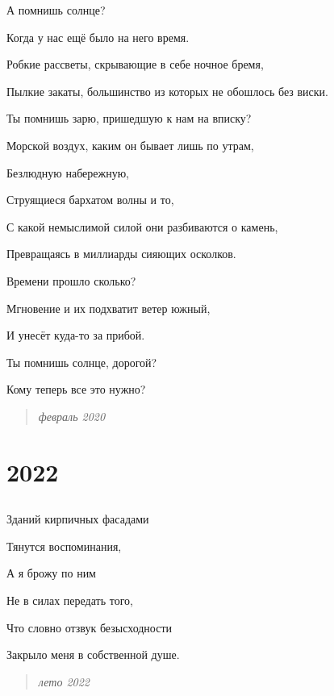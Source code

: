 \documentclass[
  a5paperpaper,
  DIV=11,
  numbers=noendperiod]{scrreprt}
\begin{document}
А помнишь солнце?

Когда у нас ещё было на него время.

Робкие рассветы, скрывающие в себе ночное бремя,

Пылкие закаты, большинство из которых не обошлось без виски.

Ты помнишь зарю, пришедшую к нам на вписку?

Морской воздух, каким он бывает лишь по утрам,

Безлюдную набережную,

Струящиеся бархатом волны и то,

С какой немыслимой силой они разбиваются о камень,

Превращаясь в миллиарды сияющих осколков.

Времени прошло сколько?

Мгновение и их подхватит ветер южный,

И унесёт куда-то за прибой.

Ты помнишь солнце, дорогой?

Кому теперь все это нужно?

\begin{quote}
\emph{февраль 2020}
\end{quote}


\chapter{2022}\label{section-10}

\section{}\label{section-11}

Зданий кирпичных фасадами

Тянутся воспоминания,

А я брожу по ним

Не в силах передать того,

Что словно отзвук безысходности

Закрыло меня в собственной душе.

\begin{quote}
\emph{лето 2022}
\end{quote}

\section{}\label{section-12}
\end{document}
